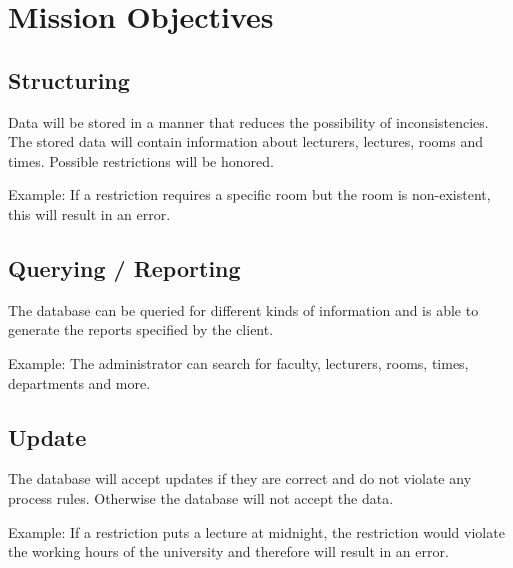 \section{Mission Objectives}
\subsection{Structuring}
Data will be stored in a manner that reduces the possibility of inconsistencies. The stored data
will contain information about lecturers, lectures, rooms and times. Possible restrictions
will be honored.

Example: If a restriction requires a specific room but the room is non-existent, this
will result in an error.

\subsection{Querying / Reporting}
The database can be queried for different kinds of information and is able to generate the reports
specified by the client.

Example: The administrator can search for faculty, lecturers, rooms, times, departments and more.

\subsection{Update}
The database will accept updates if they are correct and do not violate any process rules. Otherwise the database
will not accept the data.

Example: If a restriction puts a lecture at midnight, the restriction would violate the working hours of the
university and therefore will result in an error.
